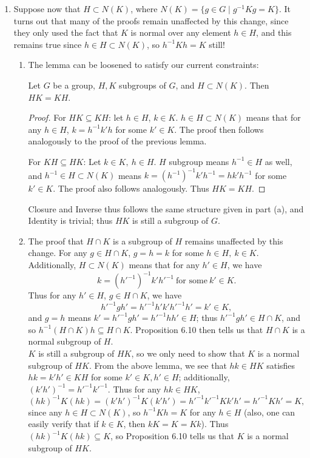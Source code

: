 \documentclass{homework}
\begin{document}
\begin{solution}
\begin{enumerate}[label=(\alph*)]
    \item Suppose now that $H\subset N(K)$, where $N(K)=\{g\in G\mid g^{-1}Kg=K\}$. It turns out
      that many of the proofs remain unaffected by this change, since they only used the fact that
      $K$ is normal over any element $h\in H$, and this remains true since $h\in H\subset N(K)$, so
      $h^{-1}Kh=K$ still!
      \begin{enumerate}[label=(\alph*)]
        \item The lemma can be loosened to satisfy our current constraints:
          \begin{lemma}{}
            Let $G$ be a group, $H,K$ subgroups of $G$, and $H\subset N(K)$. Then $HK=KH$.
          \end{lemma}
          \begin{proof}[Proof]
            For $HK\subseteq KH$: let $h\in H$, $k\in K$. $h\in H\subset N(K)$ means that for any
            $h\in H$, $k=h^{-1}k'h$ for some $k'\in K$. The proof then follows analogously to the
            proof of the previous lemma.

            For $KH\subseteq HK$: Let $k\in K,\ h\in H$. $H$ subgroup means $h^{-1}\in H$ as well,
            and $h^{-1}\in H\subset N(K)$ means $k=(h^{-1})^{-1}k'h^{-1}=hk'h^{-1}$ for some $k'\in
            K$. The proof also follows analogously. Thus $HK=KH$.
          \end{proof}

          Closure and Inverse thus follows the same structure given in part (a), and Identity is
          trivial; thus $HK$ is still a subgroup of $G$.

        \item The proof that $H\cap K$ is a subgroup of $H$ remains unaffected by this change. For
          any $g\in H\cap K$, $g=h=k$ for some $h\in H,\ k\in K$. Additionally, $H\subset N(K)$
          means that for any $h'\in H$, we have \[
            k=(h'^{-1})^{-1}k'h'^{-1} ~\text{for some}~k'\in K
          .\] Thus for any $h'\in H$, $g\in H\cap K$, we have \[
            h'^{-1}gh'=h'^{-1}h'k'h'^{-1}h'=k'\in K
          ,\] and $g=h$ means $k'=h'^{-1}gh'=h'^{-1}hh'\in H$; thus $h'^{-1}gh'\in H\cap K$, and so
          $h^{-1}(H\cap K)h\subseteq H\cap K$. Proposition 6.10 then tells us that $H\cap K$ is a
          normal subgroup of $H$.\\

          $K$ is still a subgroup of $HK$, so we only need to show that $K$ is a normal subgroup of
          $HK$. From the above lemma, we see that $hk\in HK$ satisfies $hk=k'h'\in KH$ for some
          $k'\in K,h'\in H$; additionally, $(k'h')^{-1}=h'^{-1}k'^{-1}$. Thus for any $hk\in HK$, \[
            (hk)^{-1}K(hk)=(k'h')^{-1}K(k'h')=h'^{-1}k'^{-1}Kk'h'=h'^{-1}Kh'=K
          ,\] since any $h\in H\subset N(K)$, so $h^{-1}Kh=K$ for any $h\in H$ (also, one can easily
          verify that if $k\in K$, then $kK=K=Kk$). Thus $(hk)^{-1}K(hk)\subseteq K$, so Proposition
          6.10 tells us that $K$ is a normal subgroup of $HK$.


\end{enumerate}
\end{enumerate}
\end{solution}
\end{document}
